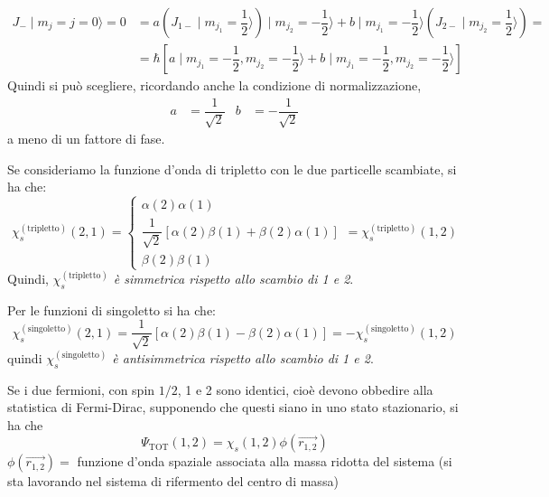 \begin{equation}
\begin{split}
J_{-} \mid m_{j} = j = 0 \rangle = 0 &= a\left(J_{1-} \mid m_{j_{1}} = 
\dfrac{1}{2} \rangle \right) \mid m_{j_{2}} = -\dfrac{1}{2}\rangle + b\mid 
m_{j_{1}} = -\dfrac{1}{2} \rangle \left( J_{2-} \mid m_{j_{2}} = \dfrac{1}{2} 
\rangle \right) = \\
&= \hbar \left[a \mid m_{j_{1}} = -\dfrac{1}{2}, m_{j_{2}} = 
-\dfrac{1}{2}\rangle + b\mid m_{j_{1}} = -\dfrac{1}{2}, m_{j_{2}} = 
-\dfrac{1}{2}\rangle \right] 
\end{split}
\end{equation}
Quindi si può scegliere, ricordando anche la condizione di normalizzazione, 
\begin{align}
a &= \dfrac{1}{\sqrt{2}} & b &= -\dfrac{1}{\sqrt{2}}
\end{align}
a meno di un fattore di fase.

Se consideriamo la funzione d'onda di tripletto con le due particelle scambiate,
si ha che:
\[
\chi _{s} ^{(\text{tripletto})} (2,1) =
\begin{cases}
\alpha(2) \alpha(1) \\
\dfrac{1}{\sqrt{2}} \left[\alpha(2)\beta(1) + \beta(2)\alpha(1)\right] \\
\beta(2)\beta(1) 
\end{cases}
= \chi _{s} ^{(\text{tripletto})} (1,2)
\]
Quindi, \textit{$\chi _{s} ^{(\text{tripletto})}$ è simmetrica rispetto allo
scambio di 1 e 2}.

Per le funzioni di singoletto si ha che:
\begin{equation}
\chi _{s} ^{(\text{singoletto})} (2,1) = \dfrac{1}{\sqrt{2}} \left[ 
\alpha(2)\beta(1) - \beta(2)\alpha(1) \right] = -\chi _{s} 
^{(\text{singoletto})} (1,2)
\end{equation}
quindi \textit{$\chi_{s} ^{(\text{singoletto})}$ è antisimmetrica rispetto allo
scambio di 1 e 2}.

Se i due fermioni, con spin $1/2$, 1 e 2 sono identici, cioè devono obbedire
alla statistica di Fermi-Dirac, supponendo che questi siano in uno stato
stazionario, si ha che
\begin{equation}
\Psi _\text{TOT} (1,2) = \chi _{s} (1,2) \phi (\vec{r_{1,2}})
\end{equation}
$\phi (\vec{r_{1,2}}) =$ funzione d'onda spaziale associata alla massa ridotta
del sistema (si sta lavorando nel sistema di rifermento del centro di massa)

